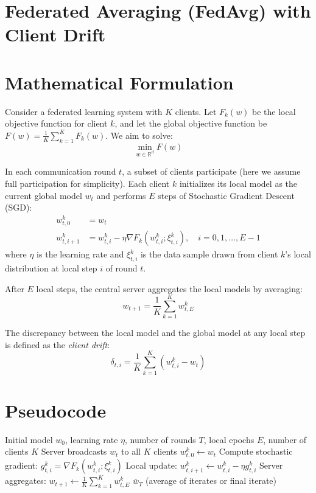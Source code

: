 \documentclass{article}
\begin{document}
\section*{Federated Averaging (FedAvg) with Client Drift}

\section*{Mathematical Formulation}
Consider a federated learning system with $K$ clients. Let $F_k(w)$ be the local objective function for client $k$, and let the global objective function be $F(w) = \frac{1}{K} \sum_{k=1}^K F_k(w)$. We aim to solve:
$$ \min_{w \in \mathbb{R}^d} F(w) $$

In each communication round $t$, a subset of clients participate (here we assume full participation for simplicity). Each client $k$ initializes its local model as the current global model $w_t$ and performs $E$ steps of Stochastic Gradient Descent (SGD):
\begin{align}
w_{t,0}^k &= w_t \\
w_{t,i+1}^k &= w_{t,i}^k - \eta \nabla F_k(w_{t,i}^k; \xi_{t,i}^k), \quad i = 0, 1, \dots, E-1
\end{align}
where $\eta$ is the learning rate and $\xi_{t,i}^k$ is the data sample drawn from client $k$'s local distribution at local step $i$ of round $t$.

After $E$ local steps, the central server aggregates the local models by averaging:
$$ w_{t+1} = \frac{1}{K} \sum_{k=1}^K w_{t,E}^k $$

The discrepancy between the local model and the global model at any local step is defined as the \textit{client drift}:
$$ \delta_{t,i} = \frac{1}{K} \sum_{k=1}^K (w_{t,i}^k - w_t) $$

\section*{Pseudocode}
\begin{algorithm}[H]
\caption{Federated Averaging (FedAvg)}
\begin{algorithmic}[1]
\Require Initial model $w_0$, learning rate $\eta$, number of rounds $T$, local epochs $E$, number of clients $K$
    \State Server broadcasts $w_t$ to all $K$ clients
        \State $w_{t,0}^k \gets w_t$
            \State Compute stochastic gradient: $g_{t,i}^k = \nabla F_k(w_{t,i}^k; \xi_{t,i}^k)$
            \State Local update: $w_{t,i+1}^k \gets w_{t,i}^k - \eta g_{t,i}^k$
        \EndFor
    \EndFor
    \State Server aggregates: $w_{t+1} \gets \frac{1}{K} \sum_{k=1}^K w_{t,E}^k$
\EndFor
\Ensure $\bar{w}_T$ (average of iterates or final iterate)
\end{algorithmic}
\end{algorithm}
\end{document}
